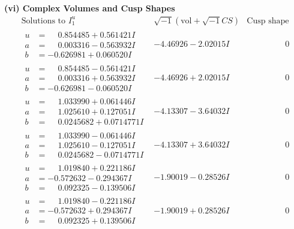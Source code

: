 \documentclass[1p]{elsarticle_modified}
\theoremstyle{definition}
\newcommand{\I}{\sqrt{-1}}
\begin{document}
\newpage\flushleft \textbf{(vi) Complex Volumes and Cusp Shapes}
$$\begin{array}{c|c|c}  
\text{Solutions to }I^u_{1}& \I (\text{vol} + \sqrt{-1}CS) & \text{Cusp shape}\\
 \hline 
\begin{aligned}
u &= \phantom{-}0.854485 + 0.561421 I \\
a &= \phantom{-}0.003316 - 0.563932 I \\
b &= -0.626981 + 0.060520 I\end{aligned}
 & -4.46926 - 2.02015 I & \phantom{-0.000000 } 0 \\ \hline\begin{aligned}
u &= \phantom{-}0.854485 - 0.561421 I \\
a &= \phantom{-}0.003316 + 0.563932 I \\
b &= -0.626981 - 0.060520 I\end{aligned}
 & -4.46926 + 2.02015 I & \phantom{-0.000000 } 0 \\ \hline\begin{aligned}
u &= \phantom{-}1.033990 + 0.061446 I \\
a &= \phantom{-}1.025610 + 0.127051 I \\
b &= \phantom{-}0.0245682 + 0.0714771 I\end{aligned}
 & -4.13307 - 3.64032 I & \phantom{-0.000000 } 0 \\ \hline\begin{aligned}
u &= \phantom{-}1.033990 - 0.061446 I \\
a &= \phantom{-}1.025610 - 0.127051 I \\
b &= \phantom{-}0.0245682 - 0.0714771 I\end{aligned}
 & -4.13307 + 3.64032 I & \phantom{-0.000000 } 0 \\ \hline\begin{aligned}
u &= \phantom{-}1.019840 + 0.221186 I \\
a &= -0.572632 - 0.294367 I \\
b &= \phantom{-}0.092325 - 0.139506 I\end{aligned}
 & -1.90019 - 0.28526 I & \phantom{-0.000000 } 0 \\ \hline\begin{aligned}
u &= \phantom{-}1.019840 - 0.221186 I \\
a &= -0.572632 + 0.294367 I \\
b &= \phantom{-}0.092325 + 0.139506 I\end{aligned}
 & -1.90019 + 0.28526 I & \phantom{-0.000000 } 0 \\ \hline\begin{aligned}

\end{aligned}
\end{array}$$
\end{document}
